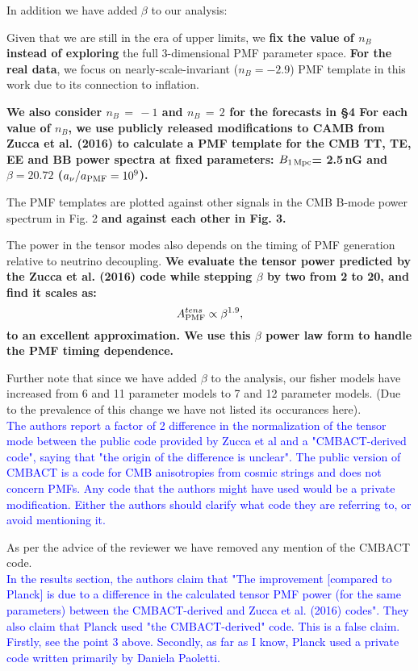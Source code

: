 \documentclass{article}
\newcommand{\apmf}{\ensuremath{A_{\rm PMF}}}
\newcommand{\bpmf}{\ensuremath{B_{\rm 1\,Mpc}}}
\newcommand{\be}{\begin{equation}}
\newcommand{\ee}{\end{equation}}
\newcommand{\added}[1]{\textbf{#1}}
\newcommand{\reviewer}[1]{\textcolor{Blue}{#1}}
\newcommand{\diff}[1]{\textcolor{PineGreen}{#1}}
\begin{document}
In addition we have added $\beta$ to our analysis:

\diff{Given that we are still in the era of upper limits, we \added{fix the value of $n_B$ instead of exploring} the full 3-dimensional PMF parameter space. 
\added{For the real data}, we focus on nearly-scale-invariant ($n_B = -2.9$) PMF template in this work due to its connection to inflation.}

\diff{\added{We also consider $n_B\,=\,-1$ and $n_B\,=\,2$ for the forecasts in \S 4 
For each value of $n_B$, we use publicly released modifications to CAMB from Zucca et al. (2016) to calculate a PMF template for the CMB TT, TE, EE and BB power spectra at fixed parameters: \bpmf = 2.5\,nG and $\beta=20.72$ ($a_{\nu}/a_{\rm{PMF}} = 10^9$).}}

\diff{The PMF templates are plotted against other signals in the CMB B-mode power spectrum in Fig. 2 \added{and against each other in Fig. 3. }}

\diff{The power in the tensor modes also depends on the timing of PMF generation relative to neutrino decoupling. 
\added{We evaluate the tensor power predicted by the Zucca et al. (2016) code while stepping $\beta$ by two from 2 to 20, and find it scales as:
\be \label{eqn:betascaling}
\apmf^{tens} \propto \beta^{1.9},
\ee
to an excellent approximation. 
We use this $\beta$ power law form to handle the PMF timing dependence.}}


Further note that since we have added $\beta$ to the analysis, our fisher models have increased from 6 and 11 parameter models to 7 and 12 parameter models. (Due to the prevalence of this change we have not listed its occurances here).\\


\reviewer{The authors report a factor of 2 difference in the normalization of the tensor mode between the public code provided by Zucca et al and a "CMBACT-derived code", saying that "the origin of the difference is unclear". The public version of CMBACT is a code for CMB anisotropies from cosmic strings and does not concern PMFs. Any code that the authors might have used would be a private modification. Either the authors should clarify what code they are referring to, or avoid mentioning it.}

As per the advice of the reviewer we have removed any mention of the CMBACT code.\\


\reviewer{In the results section, the authors claim that "The improvement [compared to Planck] is due to a difference in the calculated tensor PMF power (for the same parameters) between the CMBACT-derived and Zucca et al. (2016) codes". They also claim that Planck used "the CMBACT-derived" code. This is a false claim. Firstly, see the point 3 above. Secondly, as far as I know, Planck used a private code written primarily by Daniela Paoletti.}
\end{document}
